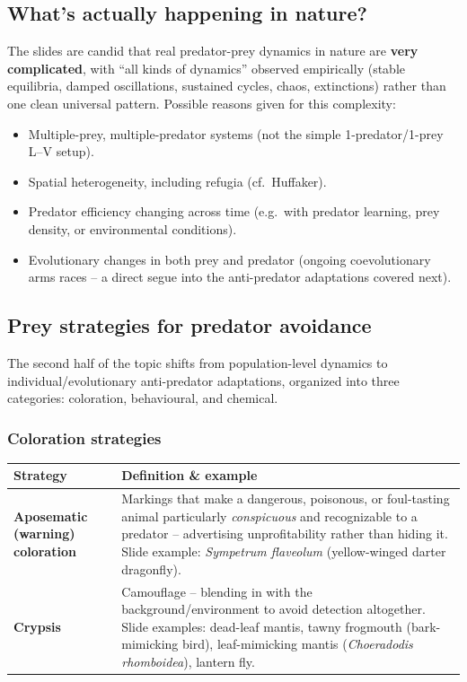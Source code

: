 \documentclass[11pt,a4paper]{article}
\begin{document}
\subsection{What's actually happening in nature?}
The slides are candid that real predator-prey dynamics in nature are \textbf{very complicated}, with ``all kinds of dynamics'' observed empirically (stable equilibria, damped oscillations, sustained cycles, chaos, extinctions) rather than one clean universal pattern. Possible reasons given for this complexity:
\begin{itemize}[leftmargin=*]
\item Multiple-prey, multiple-predator systems (not the simple 1-predator/1-prey L--V setup).
\item Spatial heterogeneity, including refugia (cf.\ Huffaker).
\item Predator efficiency changing across time (e.g.\ with predator learning, prey density, or environmental conditions).
\item Evolutionary changes in both prey and predator (ongoing coevolutionary arms races -- a direct segue into the anti-predator adaptations covered next).
\end{itemize}

\subsection{Prey strategies for predator avoidance}
The second half of the topic shifts from population-level dynamics to individual/evolutionary anti-predator adaptations, organized into three categories: coloration, behavioural, and chemical.

\subsubsection*{Coloration strategies}
\begin{center}
\begin{tabularx}{\textwidth}{@{}l X@{}}
\toprule
\textbf{Strategy} & \textbf{Definition \& example} \\
\midrule
\textbf{Aposematic (warning) coloration} & Markings that make a dangerous, poisonous, or foul-tasting animal particularly \emph{conspicuous} and recognizable to a predator -- advertising unprofitability rather than hiding it. Slide example: \textit{Sympetrum flaveolum} (yellow-winged darter dragonfly). \\
\textbf{Crypsis} & Camouflage -- blending in with the background/environment to avoid detection altogether. Slide examples: dead-leaf mantis, tawny frogmouth (bark-mimicking bird), leaf-mimicking mantis (\textit{Choeradodis rhomboidea}), lantern fly. \\
\bottomrule
\end{tabularx}
\end{center}
\end{document}
